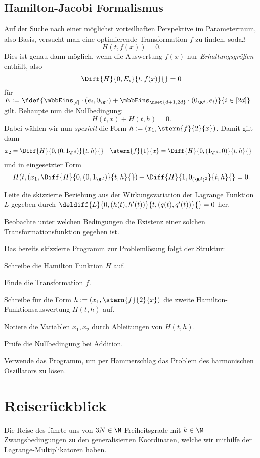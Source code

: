 \documentclass[../WiSe22ANA3.tex]{subfiles}
\begin{document}
			\subsection*{Hamilton-Jacobi Formalismus}
				Auf der Suche nach einer möglichst vorteilhaften Perspektive im Parameterraum, also Basis, versucht man eine optimierende Transformation $f$ zu finden, sodaß 
				$$H(t,f(x))=0.$$
				Dies ist genau dann möglich, wenn die Auswertung $f(x)$ nur \emph{Erhaltungsgrößen} enthält, also 
				$$\Diff{H}{0,E_i}{t,f(x)}{}=0$$
				für $E:=\fdef{\mbbEins_{[d]}\cdot(e_i,0_{\R^d})+\mbbEins_{\nset{d+1,2d}}\cdot (0_{\R^d},e_i)}{i\in[2d]}$ gilt. Behaupte nun die Nullbedingung:
				$$H(t,x)+H(t,h)=0.$$
				Dabei wählen wir nun \emph{speziell} die Form $h:=(x_1,\stern{f}{2}{x})$. Damit gilt dann
				\begin{align*}
					&x_2=\Diff{H}{0,(0,1_{\R^d})}{t,h}{} &&\stern{f}{1}{x}=\Diff{H}{0,(1_{\R^d},0)}{t,h}{}
				\end{align*}
				und in eingesetzter Form 
				$$H(t,(x_1,\Diff{H}{0,(0,1_{\R^d})}{t,h}{})+\Diff{H}{1,0_{(\R^d)^2}}{t,h}{}=0.$$
				\begin{Aufgabe}
					\nr Leite die skizzierte Beziehung aus der Wirkungsvariation der Lagrange Funktion $L$ gegeben durch $\deldiff{L}{0,(h(t),h'(t))}{t,(q(t),q'(t))}{}=0$ her. 
					
					\nr Beobachte unter welchen Bedingungen die Existenz einer solchen Transformationsfunktion gegeben ist.
				\end{Aufgabe}
				Das bereits skizzierte Programm zur Problemlösung folgt der Struktur:
				\begin{clist}
					\item Schreibe die Hamilton Funktion $H$ auf. 
					\item Finde die Transformation $f$. 
					\item Schreibe für die Form $h:=(x_1,\stern{f}{2}{x})$ die zweite Hamilton-Funktionsauswertung $H(t,h)$ auf. 
					\item Notiere die Variablen $x_1,x_2$ durch Ableitungen von $H(t,h)$. 
					\item Prüfe die Nullbedingung bei Addition. 
				\end{clist}
				\begin{Aufgabe}
					\nr Verwende das Programm, um per Hammerschlag das Problem des harmonischen Oszillators zu lösen. 
				\end{Aufgabe}
				
		\section*{Reiserückblick}
			Die Reise des  führte uns von $3N\in\N$ Freiheitsgrade mit $k\in\N$ Zwangsbedingungen zu den generalisierten Koordinaten, welche wir mithilfe der Lagrange-Multiplikatoren haben. 
			
\end{document}
